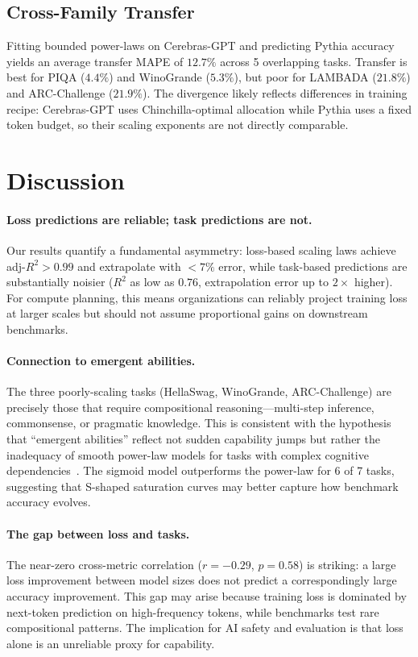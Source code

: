 \documentclass[11pt]{article}
\begin{document}
\subsection{Cross-Family Transfer}

Fitting bounded power-laws on Cerebras-GPT and predicting Pythia accuracy yields an average transfer MAPE of $12.7\%$ across 5 overlapping tasks.
Transfer is best for PIQA ($4.4\%$) and WinoGrande ($5.3\%$), but poor for LAMBADA ($21.8\%$) and ARC-Challenge ($21.9\%$).
The divergence likely reflects differences in training recipe: Cerebras-GPT uses Chinchilla-optimal allocation while Pythia uses a fixed token budget, so their scaling exponents are not directly comparable.

\section{Discussion}

\paragraph{Loss predictions are reliable; task predictions are not.}
Our results quantify a fundamental asymmetry: loss-based scaling laws achieve adj-$R^2 > 0.99$ and extrapolate with $<7\%$ error, while task-based predictions are substantially noisier ($R^2$ as low as $0.76$, extrapolation error up to $2\times$ higher).
For compute planning, this means organizations can reliably project training loss at larger scales but should not assume proportional gains on downstream benchmarks.

\paragraph{Connection to emergent abilities.}
The three poorly-scaling tasks (HellaSwag, WinoGrande, ARC-Challenge) are precisely those that require compositional reasoning---multi-step inference, commonsense, or pragmatic knowledge.
This is consistent with the hypothesis that ``emergent abilities'' reflect not sudden capability jumps but rather the inadequacy of smooth power-law models for tasks with complex cognitive dependencies~\cite{schaeffer2023emergent}.
The sigmoid model outperforms the power-law for 6 of 7 tasks, suggesting that S-shaped saturation curves may better capture how benchmark accuracy evolves.

\paragraph{The gap between loss and tasks.}
The near-zero cross-metric correlation ($r = -0.29$, $p = 0.58$) is striking: a large loss improvement between model sizes does not predict a correspondingly large accuracy improvement.
This gap may arise because training loss is dominated by next-token prediction on high-frequency tokens, while benchmarks test rare compositional patterns.
The implication for AI safety and evaluation is that loss alone is an unreliable proxy for capability.
\end{document}
